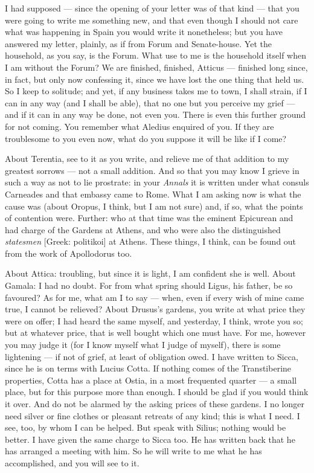 

 I had supposed --- since the opening of your letter was of that kind --- that you were going to write me something new, and that even though I should not care what was happening in Spain you would write it nonetheless; but you have answered my letter, plainly, as if from Forum and Senate-house. Yet the household, as you say, is the Forum. What use to me is the household itself when I am without the Forum? We are finished, finished, Atticus --- finished long since, in fact, but only now confessing it, since we have lost the one thing that held us. So I keep to solitude; and yet, if any business takes me to town, I shall strain, if I can in any way (and I shall be able), that no one but you perceive my grief --- and if it can in any way be done, not even you. There is even this further ground for not coming. You remember what Aledius enquired of you. If they are troublesome to you even now, what do you suppose it will be like if I come?

 About Terentia, see to it as you write, and relieve me of that addition to my greatest sorrows --- not a small addition. And so that you may know I grieve in such a way as not to lie prostrate: in your \textit{Annals} it is written under what consuls Carneades and that embassy came to Rome. What I am asking now is what the cause was (about Oropus, I think, but I am not sure) and, if so, what the points of contention were. Further: who at that time was the eminent Epicurean and had charge of the Gardens at Athens, and who were also the distinguished \textit{statesmen} [Greek: politikoi] at Athens. These things, I think, can be found out from the work of Apollodorus too.

 About Attica: troubling, but since it is light, I am confident she is well. About Gamala: I had no doubt. For from what spring should Ligus, his father, be so favoured? As for me, what am I to say --- when, even if every wish of mine came true, I cannot be relieved? About Drusus's gardens, you write at what price they were on offer; I had heard the same myself, and yesterday, I think, wrote you so; but at whatever price, that is well bought which one must have. For me, however you may judge it (for I know myself what I judge of myself), there is some lightening --- if not of grief, at least of obligation owed. I have written to Sicca, since he is on terms with Lucius Cotta. If nothing comes of the Transtiberine properties, Cotta has a place at Ostia, in a most frequented quarter --- a small place, but for this purpose more than enough. I should be glad if you would think it over. And do not be alarmed by the asking prices of these gardens. I no longer need silver or fine clothes or pleasant retreats of any kind; this is what I need. I see, too, by whom I can be helped. But speak with Silius; nothing would be better. I have given the same charge to Sicca too. He has written back that he has arranged a meeting with him. So he will write to me what he has accomplished, and you will see to it.
